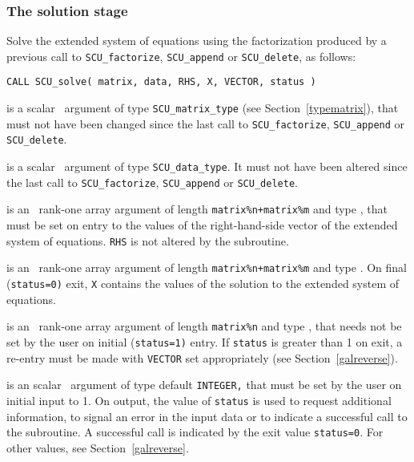\documentclass{galahad}
\newcommand{\packagename}{SCU}
\begin{document}

\subsubsection{The solution stage}
Solve the extended system of equations using
the  factorization produced by a previous call to
{\tt \packagename\_factorize}, {\tt \packagename\_append}
or {\tt \packagename\_delete},
as follows:
\vspace*{1mm}

\hskip0.5in
{\tt CALL \packagename\_solve( matrix, data, RHS, X, VECTOR, status )}

\vspace*{-2mm}
\begin{description}
 is a scalar \intentin\ argument of type
{\tt \packagename\_matrix\_type}
(see Section~\ref{typematrix}), that must not have been changed since the
last call to
{\tt \packagename\_factorize}, {\tt \packagename\_append} or
{\tt \packagename\_delete}.

 is a scalar \intentinout\ argument of type
{\tt \packagename\_data\_type}.
It must not have been altered since the last call to
{\tt \packagename\_factorize},
{\tt \packagename\_append} or
{\tt \packagename\_delete}.

 is an \intentin\ rank-one array argument of length
{\tt matrix\%n+matrix\%m}
and type \realdp,
that must be set on entry to the values of the right-hand-side vector
of the extended
system of equations. {\tt RHS} is not altered by the subroutine.

 is an \intentout\ rank-one array argument of length
{\tt matrix\%n+matrix\%m}
and type \realdp.
On final ({\tt status=0)} exit, {\tt X} contains the values of the solution
to the extended system of equations.

 is an \intentinout\ rank-one array argument of length
{\tt matrix\%n}
and type \realdp, that needs not be set by
the user on initial ({\tt status=1)} entry. If {\tt status} is greater than
1 on exit, a re-entry must be made with {\tt VECTOR} set appropriately
(see Section~\ref{galreverse}).

 is an scalar \intentinout\ argument of type default
{\tt INTEGER,} that
must be set by the user on initial input to 1. On output, the value of
{\tt status}
is used to request additional information, to signal an error
in the input data or to indicate a successful call to the subroutine.
A successful call is indicated by the exit value {\tt status=0}.
For other values, see Section~\ref{galreverse}.

\end{description}
\end{document}
